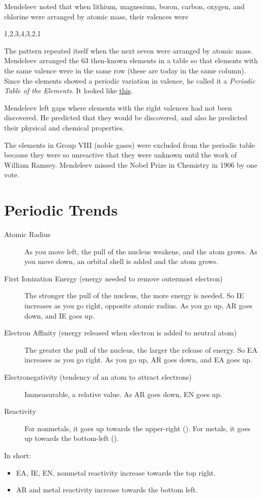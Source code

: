 \documentclass[a4paper, 8pt]{memoir}
\begin{document}
Mendeleev noted that when lithium, magnesium, boron, carbon, oxygen, and chlorine were arranged by atomic mass, their valences were
\begin{center}
1,2,3,4,3,2,1
\end{center}
The pattern repeated itself when the next seven were arranged by atomic mass. Mendeleev arranged the 63 then-known elements in a table so that elements with the same valence were in the same row (these are today in the same column). Since the elements showed a periodic variation in valence, he called it a \emph{Periodic Table of the Elements}. It looked like \href{http://bit.ly/15ceGf5}{this}.

Mendeleev left gaps where elements with the right valences had not been discovered. He predicted that they would be discovered, and also he predicted their physical and chemical properties. 

The elements in Group VIII (noble gases) were excluded from the periodic table because they were so unreactive that they were unknown until the work of William Ramsey. Mendeleev missed the Nobel Prize in Chemistry in 1906 by one vote.
\chapter{Periodic Trends}
\begin{description}
\item[Atomic Radius] As you move left, the pull of the nucleus weakens, and the atom grows. As you move down, an orbital shell is added and the atom grows.
\item[First Ionization Energy (energy needed to remove outermost electron)] The stronger the pull of the nucleus, the more energy is needed. So IE increases as you go right, opposite atomic radius. As you go up, AR goes down, and IE goes up.
\item[Electron Affinity (energy released when electron is added to neutral atom)] The greater the pull of the nucleus, the larger the release of energy. So EA increases as you go right. As you go up, AR goes down, and EA goes up.
\item[Electronegativity (tendency of an atom to attract electrons)] Immeasurable, a relative value. As AR goes down, EN goes up.
\item[Reactivity] For nonmetals, it goes up towards the upper-right (). For metals, it goes up towards the bottom-left ().
\end{description}

In short: 
\begin{itemize}
\item EA, IE, EN, nonmetal reactivity increase towards the top right. 
\item AR and metal reactivity increase towards the bottom left.
\end{itemize}
\end{document}
